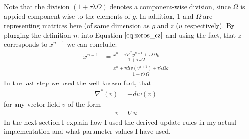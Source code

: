 Note that the division $(1+\tau \lambda \Omega)$ denotes a component-wise division, since $\Omega$ is applied component-wise to the elements of $g$. In addition, 1 and $\Omega$ are representing matrices here (of same dimension as $g$ and $z$ ($u$ respectively).
By plugging the definition $m$ into Equation $\ref{eq:zeros_ez}$ and using the fact, that $z$ corresponds to $x^{n+1}$ we can conclude:
\begin{align}
	x^{n+1} 
	&= \frac{x^n - \tau \nabla^* y^{n+1} +  \tau \lambda \Omega g}{1+\tau \lambda \Omega} \nonumber \\
	&= \frac{x^n + \tau div(y^{n+1}) +  \tau \lambda \Omega g}{1+\tau \lambda \Omega}
\label{eq:update_x_n_p_1}	
\end{align}
In the last step we used the well known fact, that 
\begin{align}
	\nabla^* (v) = -div(v)
\end{align}
for any vector-field $v$ of the form 
\begin{align}
	v = \nabla u
\end{align}
In the next section I explain how I used the derived update rules in my actual implementation and what parameter values I have used. 

